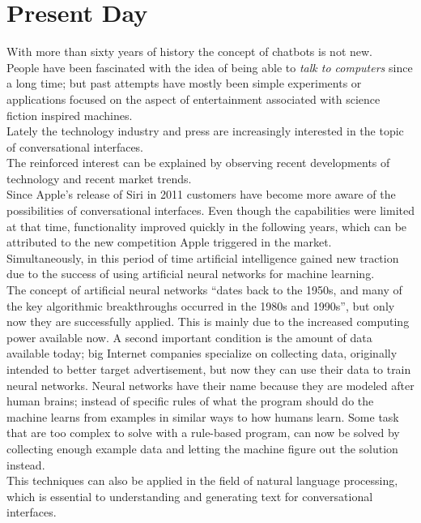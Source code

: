 \section{Present Day}
\label{presentday}


With more than sixty years of history the concept of chatbots is not new.
\\
People have been fascinated with the idea of being able to \emph{talk to computers} since a long time; but past attempts have mostly been simple experiments or applications focused on the aspect of entertainment associated with science fiction inspired machines.
\\

Lately the technology industry and press are increasingly interested in the topic of conversational interfaces.
\\
The reinforced interest can be explained by observing recent developments of technology and recent market trends.
\\

Since Apple's release of Siri in 2011\cite{iphonelaunch} customers have become more aware of the possibilities of conversational interfaces. Even though the capabilities were limited at that time, functionality improved quickly in the following years, which can be attributed to the new competition Apple triggered in the market.
\\

Simultaneously, in this period of time artificial intelligence gained new traction due to the success of using artificial neural networks for machine learning\cite{mltrend}.
\\
The concept of artificial neural networks ``dates back to the 1950s, and many of the key algorithmic breakthroughs occurred in the 1980s and 1990s''\cite{airevolution}, but only now they are successfully applied. This is mainly due to the increased computing power available now. A second important condition is the amount of data available today; big Internet companies specialize on collecting data, originally intended to better target advertisement, but now they can use their data to train neural networks. Neural networks have their name because they are modeled after human brains; instead of specific rules of what the program should do the machine learns from examples in similar ways to how humans learn. Some task that are too complex to solve with a rule-based program, can now be solved by collecting enough example data and letting the machine figure out the solution instead.
\\
This techniques can also be applied in the field of natural language processing, which is essential to understanding and generating text for conversational interfaces.
\\

